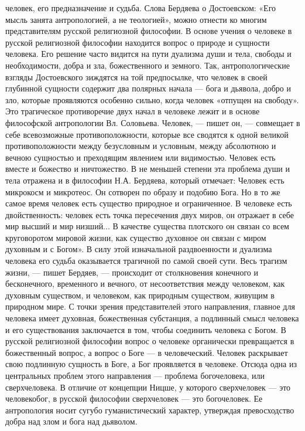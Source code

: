 \documentclass[12pt]{article}
\begin{document}
человек, его предназначение и судьба. Слова Бердяева о Достоевском: «Его мысль занята антропологией, а не
теологией», можно отнести ко многим представителям русской религиозной философии.
В  основе  учения  о  человеке  в  русской  религиозной  философии  находится  вопрос  о  природе  и  сущности
человека. Его решение часто видится на пути дуализма души и тела, свободы и необходимости, добра и зла,
божественного и земного. Так, антропологические взгляды Достоевского зиждятся на той предпосылке, что
человек в своей глубинной сущности содержит два полярных начала — бога и дьявола, добро и зло, которые
проявляются особенно сильно, когда человек «отпущен на свободу».
Это  трагическое  противоречие  двух  начал  в  человеке  лежит  и  в  основе  философской  антропологии  Вл.
Соловьева.
Человек, — пишет он, — совмещает в себе всевозможные противоположности, которые все сводятся к одной
великой  противоположности  между  безусловным  и  условным,  между  абсолютною  и  вечною  сущностью  и
преходящим явлением или видимостью. Человек есть вместе и божество и ничтожество.
В не меньшей степени эта проблема души и тела отражена и в философии Н.А. Бердяева, который отмечает:
Человек есть микрокосм и микротеос. Он сотворен по образу и подобию Бога. Но в то же самое время человек
есть существо природное и ограниченное. В человеке есть двойственность: человек есть точка пересечения
двух миров, он отражает в себе мир высший и мир низший... В качестве существа плотского он связан со всем
круговоротом мировой жизни, как существо духовное он связан с миром духовным и с Богом».
В силу этой изначальной раздвоенности и дуализма человека его судьба оказывается трагичной по самой своей
сути.
Весь трагизм жизни, — пишет Бердяев, — происходит от столкновения конечного и бесконечного, временного и
вечного,  от  несоответствия  между  человеком,  как  духовным  существом,  и  человеком,  как  природным
существом, живущим в природном мире.
С  точки  зрения  представителей  этого  направления,  главное  для  человека  имеет  духовная,  божественная
субстанция, а подлинный смысл человека и его существования заключается в том, чтобы соединить человека с
Богом.  В  русской  религиозной  философии  вопрос  о  человеке  органически  превращается  в  божественный
вопрос, а вопрос о Боге — в человеческий. Человек раскрывает свою подлинную сущность в Боге, а Бог
проявляется в человеке. Отсюда одна из центральных проблем этого направления — проблема богочеловека,
или сверхчеловека. В отличие от концепции Ницше, у которого сверхчеловек — это человекобог, в русской
философии  сверхчеловек  —  это  богочеловек.  Ее  антропология  носит  сугубо  гуманистический  характер,
утверждая превосходство добра над злом и бога над дьяволом.
\end{document}
